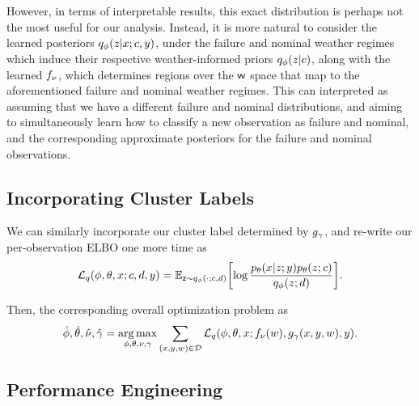 However, in terms of interpretable results, this exact distribution is perhaps not the most useful for our analysis. Instead, it is more natural to consider the learned posteriors $\qvd{z\given x;c,y}$, under the failure and nominal weather regimes which induce their respective weather-informed priors $\qvd{z\given c}$, along with the learned $f_{\nu}$, which determines regions over the $\mathsf w$ space that map to the aforementioned failure and nominal weather regimes. This can interpreted as assuming that we have a different failure and nominal distributions, and aiming to simultaneously learn how to classify a new observation as failure and nominal, and the corresponding approximate posteriors for the failure and nominal observations.

\subsection{Incorporating Cluster Labels}

We can similarly incorporate our cluster label determined by $g_{\gamma}$, and re-write our per-observation ELBO one more time as 
\begin{equation}
    \elbo{q}{\phi, \theta, x; c,d,y} = \EX{\rz \sim \qvd{\cdot ;c,d} }{ \log\frac{\pld{x\given z;y}\pld{z; c} }{\qvd{z; d}}}.
\end{equation}

\begin{proposition}
    Then, the corresponding overall optimization problem as 
    \begin{equation}
        \hat\phi,\hat\theta,\hat\nu,\hat\gamma = \argmax_{\phi,\theta,\nu,\gamma} \sum_{(x,y,w)\in \Data} \elbo{q}{\phi,\theta,x;\fvd{w},\gvd{x,y,w}, y}.
    \end{equation}
\end{proposition}

\subsection{Performance Engineering}

